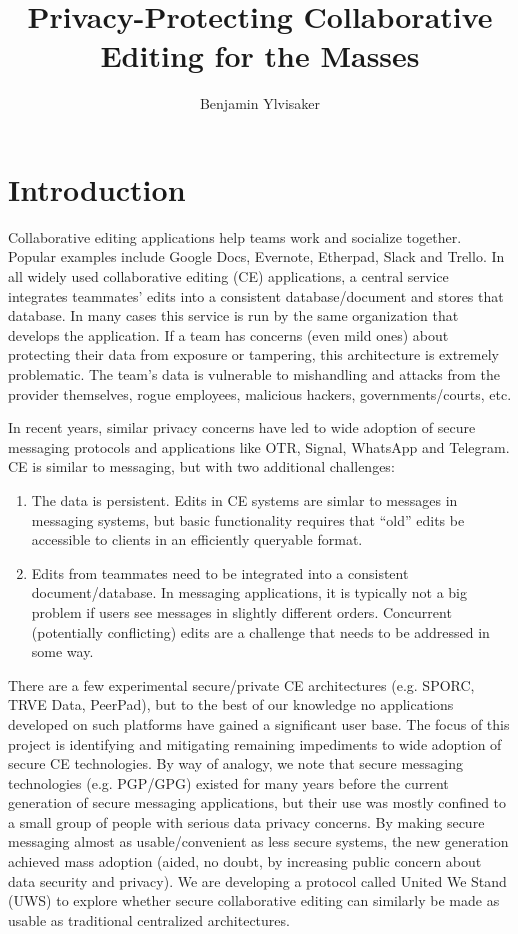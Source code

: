 \documentclass{article}
\begin{document}
\title{Privacy-Protecting Collaborative Editing for the Masses}
\author{Benjamin Ylvisaker}

\maketitle

\section{Introduction}

Collaborative editing applications help teams work and socialize together.
Popular examples include Google Docs, Evernote, Etherpad, Slack and Trello.
In all widely used collaborative editing (CE) applications, a central service integrates teammates' edits into a consistent database/document and stores that database.
In many cases this service is run by the same organization that develops the application.
If a team has concerns (even mild ones) about protecting their data from exposure or tampering, this architecture is extremely problematic.
The team's data is vulnerable to mishandling and attacks from the provider themselves, rogue employees, malicious hackers, governments/courts, etc.

In recent years, similar privacy concerns have led to wide adoption of secure messaging protocols and applications like OTR, Signal, WhatsApp and Telegram.
CE is similar to messaging, but with two additional challenges:
\begin{enumerate}
\item The data is persistent.
  Edits in CE systems are simlar to messages in messaging systems, but basic functionality requires that ``old'' edits be accessible to clients in an efficiently queryable format.
\item Edits from teammates need to be integrated into a consistent document{\slash}database.
  In messaging applications, it is typically not a big problem if users see messages in slightly different orders.
  Concurrent (potentially conflicting) edits are a challenge that needs to be addressed in some way.
\end{enumerate}

There are a few experimental secure/private CE architectures (e.g. SPORC, TRVE Data, PeerPad), but to the best of our knowledge no applications developed on such platforms have gained a significant user base.
The focus of this project is identifying and mitigating remaining impediments to wide adoption of secure CE technologies.
By way of analogy, we note that secure messaging technologies (e.g. PGP/GPG) existed for many years before the current generation of secure messaging applications, but their use was mostly confined to a small group of people with serious data privacy concerns.
By making secure messaging almost as usable/convenient as less secure systems, the new generation achieved mass adoption (aided, no doubt, by increasing public concern about data security and privacy).
We are developing a protocol called United We Stand (UWS) to explore whether secure collaborative editing can similarly be made as usable as traditional centralized architectures.
\end{document}
